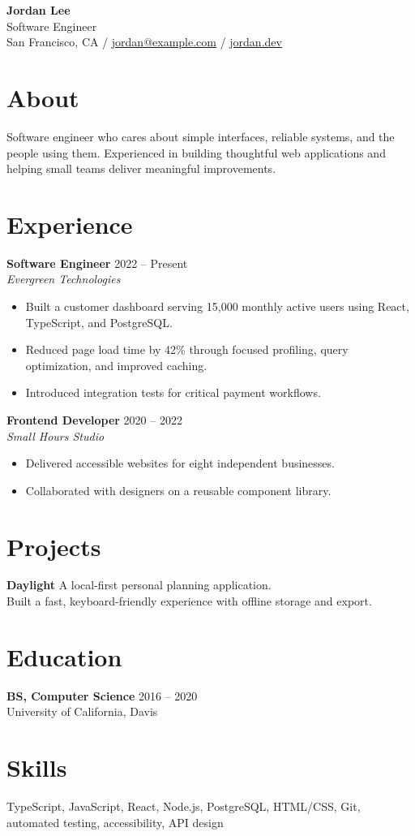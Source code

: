 \documentclass[10pt,a4paper]{article}
\begin{document}
{\Huge\bfseries Jordan Lee}\\[5pt]
{\large Software Engineer}\\[8pt]
San Francisco, CA \enspace / \enspace
\href{mailto:jordan@example.com}{jordan@example.com} \enspace / \enspace
\href{https://example.com}{jordan.dev}

\section{About}
Software engineer who cares about simple interfaces, reliable systems, and
the people using them. Experienced in building thoughtful web applications
and helping small teams deliver meaningful improvements.

\section{Experience}
\textbf{Software Engineer} \hfill 2022 -- Present\\
\textit{Evergreen Technologies}
\begin{itemize}
\item Built a customer dashboard serving 15,000 monthly active users
      using React, TypeScript, and PostgreSQL.
\item Reduced page load time by 42\% through focused profiling,
      query optimization, and improved caching.
\item Introduced integration tests for critical payment workflows.
\end{itemize}
\textbf{Frontend Developer} \hfill 2020 -- 2022\\
\textit{Small Hours Studio}
\begin{itemize}
\item Delivered accessible websites for eight independent businesses.
\item Collaborated with designers on a reusable component library.
\end{itemize}

\section{Projects}
\textbf{Daylight} \enspace A local-first personal planning application.\\
Built a fast, keyboard-friendly experience with offline storage and export.

\section{Education}
\textbf{BS, Computer Science} \hfill 2016 -- 2020\\
University of California, Davis

\section{Skills}
TypeScript, JavaScript, React, Node.js, PostgreSQL, HTML/CSS, Git,
automated testing, accessibility, API design
\end{document}

